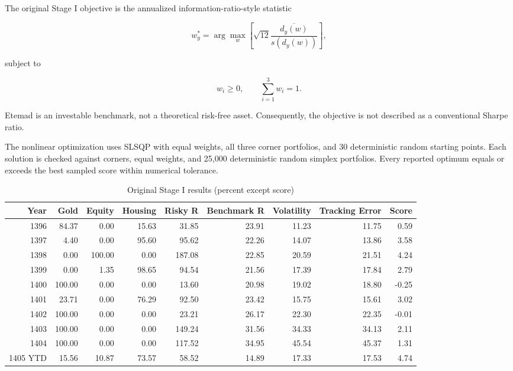 \documentclass[11pt,a4paper]{article}
\begin{document}
The original Stage I objective is the annualized information-ratio-style statistic

\begin{equation}
w_y^*=\arg\max_{w}
\left[
\sqrt{12}\frac{\overline{d_y(w)}}{s(d_y(w))}
\right],
\end{equation}

subject to

\begin{equation}
w_i\ge 0,
\qquad
\sum_{i=1}^{3}w_i=1.
\end{equation}

Etemad is an investable benchmark, not a theoretical risk-free asset. Consequently, the
objective is not described as a conventional Sharpe ratio.

The nonlinear optimization uses SLSQP with equal weights, all three corner portfolios, and
30 deterministic random starting points. Each solution is checked against corners, equal
weights, and 25,000 deterministic random simplex portfolios. Every reported optimum equals or
exceeds the best sampled score within numerical tolerance.

\begin{landscape}
\begin{table}[p]
\centering
\small
\caption{Original Stage I results (percent except score)}
\begin{tabular}{rrrrrrrrr}
\toprule
Year & Gold & Equity & Housing & Risky R & Benchmark R & Volatility & Tracking Error & Score \\
\midrule
1396 & 84.37 & 0.00 & 15.63 & 31.85 & 23.91 & 11.23 & 11.75 & 0.59 \\
1397 & 4.40 & 0.00 & 95.60 & 95.62 & 22.26 & 14.07 & 13.86 & 3.58 \\
1398 & 0.00 & 100.00 & 0.00 & 187.08 & 22.85 & 20.59 & 21.51 & 4.24 \\
1399 & 0.00 & 1.35 & 98.65 & 94.54 & 21.56 & 17.39 & 17.84 & 2.79 \\
1400 & 100.00 & 0.00 & 0.00 & 13.60 & 20.98 & 19.02 & 18.80 & -0.25 \\
1401 & 23.71 & 0.00 & 76.29 & 92.50 & 23.42 & 15.75 & 15.61 & 3.02 \\
1402 & 100.00 & 0.00 & 0.00 & 23.21 & 26.17 & 22.30 & 22.35 & -0.01 \\
1403 & 100.00 & 0.00 & 0.00 & 149.24 & 31.56 & 34.33 & 34.13 & 2.11 \\
1404 & 100.00 & 0.00 & 0.00 & 117.52 & 34.95 & 45.54 & 45.37 & 1.31 \\
1405 YTD & 15.56 & 10.87 & 73.57 & 58.52 & 14.89 & 17.33 & 17.53 & 4.74 \\
\bottomrule
\end{tabular}
\end{table}
\end{landscape}
\end{document}
